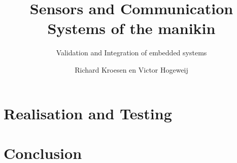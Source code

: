 \documentclass{layout/tudelft-report}
\begin{document}
    \frontmatter

    \title{Sensors and Communication Systems of the manikin}
    \subtitle{Validation and Integration of embedded systems}
    \author{Richard Kroesen en Victor Hogeweij}
    \subject{Project Report}

    \makecover
    \afterpage{\blankpage}
    
    
    
    

    
    
    \tableofcontents    
    \printnomenclature
    \listoffigures
    \listoftables

    \mainmatter
    
    

    \epigraphhead[650]{}
    
    
    
    

    \epigraphhead[650]{}
    \part{Realisation and Testing}
    \label{part:additional}
    
    
    

    \epigraphhead[650]{}
    \part{Conclusion}
    \label{part:closure}

    
    

    \printbibliography[title=References]
    
    \appendix
    
    
    
    
\end{document}
